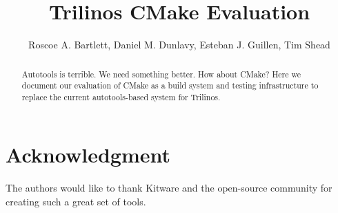 \documentclass[pdf,ps2pdf,11pt]{SANDreport}
\title{
Trilinos CMake Evaluation
}
\author{Roscoe A. Bartlett, Daniel M. Dunlavy,  Esteban J. Guillen, Tim Shead}
\date{}
\begin{document}
\raggedright

\maketitle

%

%
\begin{abstract}
%
Autotools is terrible. We need something better.  How about CMake?
Here we document our evaluation of CMake as a build system and testing
infrastructure to replace the current autotools-based system for
Trilinos.
%
\end{abstract}
%

%
\clearpage
\section*{Acknowledgment}

The authors would like to thank Kitware and the open-source community
for creating such a great set of tools.

%

%
\clearpage
\tableofcontents

\end{document}
